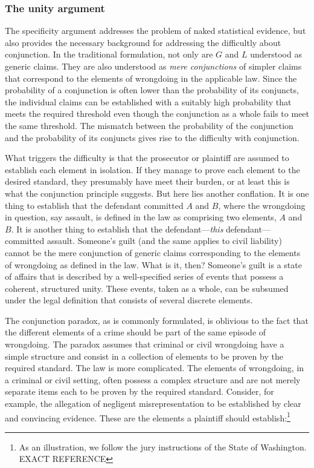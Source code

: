 \documentclass[
  10pt,
  dvipsnames,enabledeprecatedfontcommands]{scrartcl}
\begin{document}
\hypertarget{the-unity-argument}{%
\subsubsection{The unity argument}\label{the-unity-argument}}

The specificity argument addresses the problem of naked statistical
evidence, but also provides the necessary background for addressing the
difficultly about conjunction. In the traditional formulation, not only
are \(G\) and \(L\) understood as generic claims. They are also
understood as \emph{mere conjunctions} of simpler claims that correspond
to the elements of wrongdoing in the applicable law. Since the
probability of a conjunction is often lower than the probability of its
conjuncts, the individual claims can be established with a suitably high
probability that meets the required threshold even though the
conjunction as a whole fails to meet the same threshold. The mismatch
between the probability of the conjunction and the probability of its
conjuncts gives rise to the difficulty with conjunction.

What triggers the difficulty is that the prosecutor or plaintiff are
assumed to establish each element in isolation. If they manage to prove
each element to the desired standard, they presumably have meet their
burden, or at least this is what the conjunction principle suggests. But
here lies another conflation. It is one thing to establish that the
defendant committed \(A\) and \(B\), where the wrongdoing in question,
say assault, is defined in the law as comprising two elements, \(A\) and
\(B\). It is another thing to establish that the
defendant---\textit{this} defendant---committed assault. Someone's guilt
(and the same applies to civil liability) cannot be the mere conjunction
of generic claims corresponding to the elements of wrongdoing as defined
in the law. What is it, then? Someone's guilt is a state of affairs that
is described by a well-specified series of events that possess a
coherent, structured unity. These events, taken as a whole, can be
subsumed under the legal definition that consists of several discrete
elements.

The conjunction paradox, as is commonly formulated, is oblivious to the
fact that the different elements of a crime should be part of the same
episode of wrongdoing. The paradox assumes that criminal or civil
wrongdoing have a simple structure and consist in a collection of
elements to be proven by the required standard. The law is more
complicated. The elements of wrongdoing, in a criminal or civil setting,
often possess a complex structure and are not merely separate items each
to be proven by the required standard. Consider, for example, the
allegation of negligent misrepresentation to be established by clear and
convincing evidence. These are the elements a plaintiff should
establish:\footnote{As an illustration, we follow the jury instructions
  of the State of Washington. EXACT REFERENCE}
\end{document}
